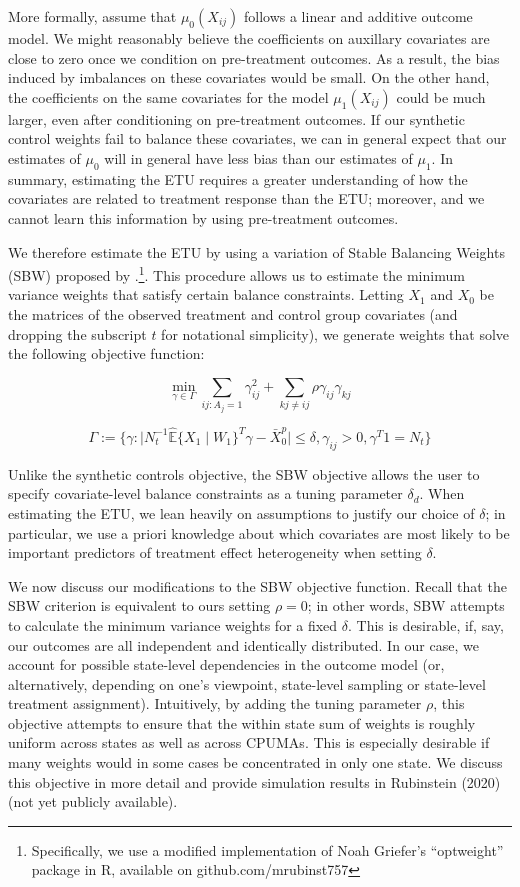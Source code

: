 \documentclass[12pt]{article}
\begin{document}
More formally, assume that $\mu_0(X_{ij})$ follows a linear and additive outcome model. We might reasonably believe the coefficients on auxillary covariates are close to zero once we condition on pre-treatment outcomes. As a result, the bias induced by imbalances on these covariates would be small. On the other hand, the coefficients on the same covariates for the model $\mu_1(X_{ij})$ could be much larger, even after conditioning on pre-treatment outcomes. If our synthetic control weights fail to balance these covariates, we can in general expect that our estimates of $\mu_0$ will in general have less bias than our estimates of $\mu_1$. In summary, estimating the ETU requires a greater understanding of how the covariates are related to treatment response than the ETU; moreover, and we cannot learn this information by using pre-treatment outcomes.

We therefore estimate the ETU by using a variation of Stable Balancing Weights (SBW) proposed by \cite{zubizarreta2015stable}.\footnote{Specifically, we use a modified implementation of Noah Griefer's ``optweight'' package in R, available on github.com/mrubinst757}. This procedure allows us to estimate the minimum variance weights that satisfy certain balance constraints. Letting $X_1$ and $X_0$ be the matrices of the observed treatment and control group covariates (and dropping the subscript $t$ for notational simplicity), we generate weights that solve the following objective function:

$$
\min_{\gamma \in \Gamma} \sum_{ij: A_j = 1} \gamma_{ij}^2 + \sum_{kj \ne ij}\rho \gamma_{ij}\gamma_{kj}
$$

$$
\Gamma := \{\gamma: \mid N_t^{-1}\hat{\mathbb{E}}\{X_1 \mid W_1\}^T\gamma - \bar{X}_0^p \mid \le \delta, \gamma_{ij} > 0, \gamma^T1 = N_t\}
$$

Unlike the synthetic controls objective, the SBW objective allows the user to specify covariate-level balance constraints as a tuning parameter $\delta_d$. When estimating the ETU, we lean heavily on assumptions to justify our choice of $\delta$; in particular, we use a priori knowledge about which covariates are most likely to be important predictors of treatment effect heterogeneity when setting $\delta$. 

We now discuss our modifications to the SBW objective function. Recall that the SBW criterion is equivalent to ours setting $\rho = 0$; in other words, SBW attempts to calculate the minimum variance weights for a fixed $\delta$. This is desirable, if, say, our outcomes are all independent and identically distributed. In our case, we account for possible state-level dependencies in the outcome model (or, alternatively, depending on one's viewpoint, state-level sampling or state-level treatment assignment). Intuitively, by adding the tuning parameter $\rho$, this objective attempts to ensure that the within state sum of weights is roughly uniform across states as well as across CPUMAs. This is especially desirable if many weights would in some cases be concentrated in only one state. We discuss this objective in more detail and provide simulation results in Rubinstein (2020) (not yet publicly available).
\end{document}
